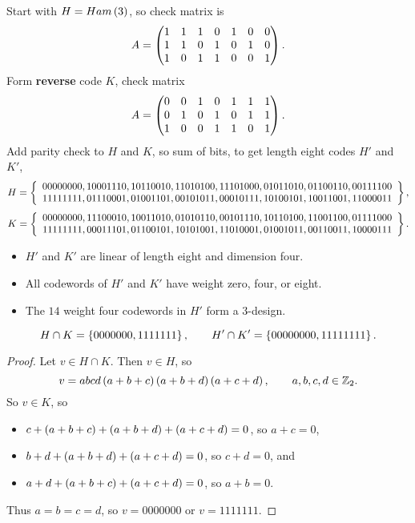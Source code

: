 Start with $ H = Ham\br{3} $, so check matrix is
$$ A = \begin{pmatrix} 1 & 1 & 1 & 0 & 1 & 0 & 0 \\ 1 & 1 & 0 & 1 & 0 & 1 & 0 \\ 1 & 0 & 1 & 1 & 0 & 0 & 1 \end{pmatrix}. $$
Form \textbf{reverse} code $ K $, check matrix
$$ A = \begin{pmatrix} 0 & 0 & 1 & 0 & 1 & 1 & 1 \\ 0 & 1 & 0 & 1 & 0 & 1 & 1 \\ 1 & 0 & 0 & 1 & 1 & 0 & 1 \end{pmatrix}. $$
Add parity check to $ H $ and $ K $, so sum of bits, to get length eight codes $ H' $ and $ K' $,
$$ H = \cbr{
\begin{array}{cccccccc}
00000000, 10001110, 10110010, 11010100, 11101000, 01011010, 01100110, 00111100 \\
11111111, 01110001, 01001101, 00101011, 00010111, 10100101, 10011001, 11000011
\end{array}
}, $$
$$ K = \cbr{
\begin{array}{cccccccc}
00000000, 11100010, 10011010, 01010110, 00101110, 10110100, 11001100, 01111000 \\
11111111, 00011101, 01100101, 10101001, 11010001, 01001011, 00110011, 10000111
\end{array}
}. $$

\begin{note*}
\hfill
\begin{itemize}
\item $ H' $ and $ K' $ are linear of length eight and dimension four.
\item All codewords of $ H' $ and $ K' $ have weight zero, four, or eight.
\item The $ 14 $ weight four codewords in $ H' $ form a $ 3 $-design.
\end{itemize}
\end{note*}

\begin{proposition}
\label{prop:1.13}
$$ H \cap K = \cbr{0000000, 1111111}, \qquad H' \cap K' = \cbr{00000000, 11111111}. $$
\end{proposition}

\begin{proof}
Let $ v \in H \cap K $. Then $ v \in H $, so
$$ v = abcd\br{a + b + c}\br{a + b + d}\br{a + c + d}, \qquad a, b, c, d \in \Z_2. $$
So $ v \in K $, so
\begin{itemize}
\item $ c + \br{a + b + c} + \br{a + b + d} + \br{a + c + d} = 0 $, so $ a + c = 0 $,
\item $ b + d + \br{a + b + d} + \br{a + c + d} = 0 $, so $ c + d = 0 $, and
\item $ a + d + \br{a + b + c} + \br{a + c + d} = 0 $, so $ a + b = 0 $.
\end{itemize}
Thus $ a = b = c = d $, so $ v = 0000000 $ or $ v = 1111111 $.
\end{proof}

